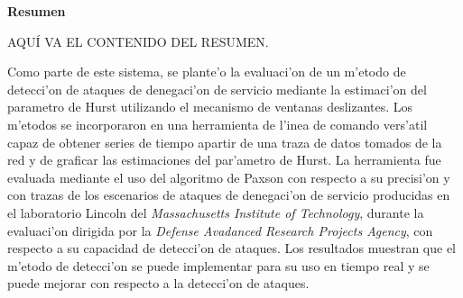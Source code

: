 \setcounter{page}{4}
\begin{center}
	{\bf Resumen}
\end{center}	

AQU\'I VA EL CONTENIDO DEL RESUMEN.
\vspace{5 mm}

Como parte de este sistema, se plante'o la evaluaci'on de un m'etodo de detecci'on de
ataques de denegaci'on de servicio mediante la estimaci'on del parametro de
Hurst utilizando el mecanismo de ventanas deslizantes. Los m'etodos se
incorporaron en una herramienta de l'inea de comando vers'atil capaz de obtener
series de tiempo apartir de una traza de datos tomados de la red y de graficar
las estimaciones del par'ametro de Hurst. La herramienta fue evaluada mediante
el uso del algoritmo de Paxson con respecto a su precisi'on y con trazas de los
escenarios de ataques de denegaci'on de servicio producidas en el laboratorio
Lincoln del {\it Massachusetts Institute of Technology}, durante la evaluaci'on
dirigida por la {\it Defense Avadanced Research Projects Agency}, con respecto
a su capacidad de detecci'on de ataques. Los resultados muestran que el m'etodo
de detecci'on se puede implementar para su uso en tiempo real y se puede
mejorar con respecto a la detecci'on de ataques.
\newpage

